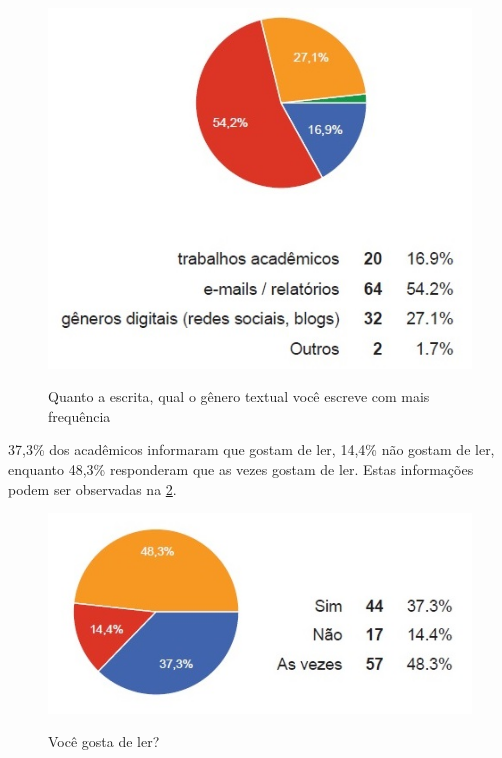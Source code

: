 \documentclass[
	article,			%
	11pt,				%
	oneside,			%
	a4paper,			%
	english,			%
	brazil,				%
	sumario=tradicional
	]{abntex2}
\begin{document}
\begin{figure}[h]  
	\begin{center} 
		\begin{center}
			\changecaptionwidth 
			\captionwidth{13.5cm} %
			\caption{\label{genero} Quanto a escrita, qual o gênero textual você escreve com mais frequência}
			{\includegraphics[scale=0.8]{imagens/generotextual}}
		\end{center}
	\end{center}
\end{figure}
\FloatBarrier


37,3\% dos acadêmicos informaram que gostam de ler, 14,4\% não gostam de ler, enquanto 48,3\% responderam que as vezes gostam de ler. Estas informações podem ser observadas na \figurename{ \ref{gosta}}.

\begin{figure}[h]  
	\begin{center} 
		\begin{center}
			\changecaptionwidth 
			\captionwidth{13.5cm} %
			\caption{\label{gosta} Você gosta de ler?}
			{\includegraphics[scale=0.8]{imagens/gostaler}}
		\end{center}
	\end{center}
\end{figure}
\FloatBarrier
\end{document}
